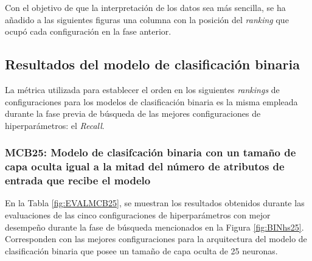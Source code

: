 Con el objetivo de que la interpretación de los datos sea más sencilla, se ha añadido a las siguientes figuras una columna con la posición del \textit{ranking} que ocupó cada configuración en la fase anterior.


\subsection{Resultados del modelo de clasificación binaria}
La métrica utilizada para establecer el orden en los siguientes \textit{rankings} de configuraciones para los modelos de clasificación binaria es la misma empleada durante la fase previa de búsqueda de las mejores configuraciones de hiperparámetros: el \textit{Recall}.

\subsubsection{MCB25: Modelo de clasifcación binaria con un tamaño de capa oculta igual a la mitad del número de atributos de entrada que recibe el modelo}
En la Tabla \ref{fig:EVALMCB25}, se muestran los resultados obtenidos durante las evaluaciones de las cinco configuraciones de hiperparámetros con mejor desempeño durante la fase de búsqueda mencionados en la Figura \ref{fig:BINhs25}. Corresponden con las mejores configuraciones para la arquitectura del modelo de clasificación binaria que posee un tamaño de capa oculta de 25 neuronas.

